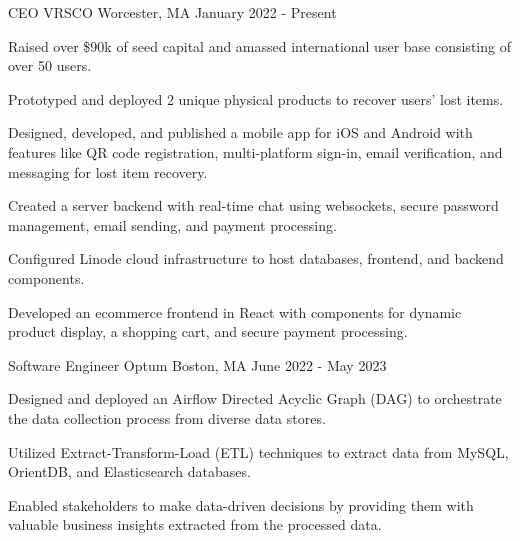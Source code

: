 

\begin{cventries}

  \cventry
    {CEO} %
    {VRSCO} %
    {Worcester, MA} %
    {January 2022 - Present}
    {
      \begin{cvitems} %
      \item {Raised over \$90k of seed capital and amassed international user base consisting of over 50 users.}
      \item {Prototyped and deployed 2 unique physical products to recover users' lost items.}
      \item {Designed, developed, and published a mobile app for iOS and Android with features like QR code registration, multi-platform sign-in, email verification, and messaging for lost item recovery.}
      \item {Created a server backend with real-time chat using websockets, secure password management, email sending, and payment processing.}
      \item {Configured Linode cloud infrastructure to host databases, frontend, and backend components.}
      \item {Developed an ecommerce frontend in React with components for dynamic product display, a shopping cart, and secure payment processing.}
      \end{cvitems}
    }
  \cventry
    {Software Engineer} %
    {Optum} %
    {Boston, MA} %
    {June 2022 - May 2023} %
    {
      \begin{cvitems} %
        \item {Designed and deployed an Airflow Directed Acyclic Graph (DAG) to orchestrate the data collection process from diverse data stores.}
        \item {Utilized Extract-Transform-Load (ETL) techniques to extract data from MySQL, OrientDB, and Elasticsearch databases.}
        \item {Enabled stakeholders to make data-driven decisions by providing them with valuable business insights extracted from the processed data.}

\end{cvitems}}
\end{cventries}
